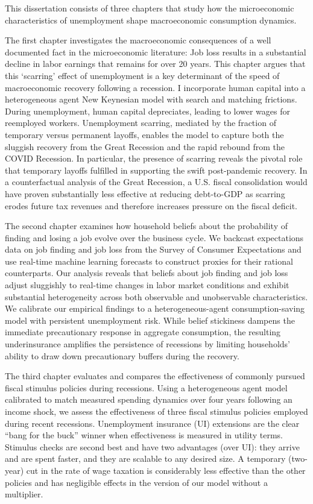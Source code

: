 %

This dissertation consists of three chapters that study how the microeconomic characteristics of unemployment shape macroeconomic consumption dynamics.

The first chapter investigates the macroeconomic consequences of a well documented fact in the microeconomic literature: Job loss results in a substantial decline in labor earnings that remains for over 20 years. This chapter argues that this `scarring' effect of unemployment is a key determinant of the speed of macroeconomic recovery following a recession. I incorporate human capital into a heterogeneous agent New Keynesian model with search and matching frictions. During unemployment, human capital depreciates, leading to lower wages for reemployed workers. Unemployment scarring, mediated by the fraction of temporary versus permanent layoffs, enables the model to capture both the sluggish recovery from the Great Recession and the rapid rebound from the COVID Recession. In particular, the presence of scarring reveals the pivotal role that temporary layoffs fulfilled in supporting the swift post-pandemic recovery. In a counterfactual analysis of the Great Recession, a U.S. fiscal consolidation would have proven substantially less effective at reducing debt-to-GDP as scarring erodes future tax revenues and therefore increases pressure on the fiscal deficit.

The second chapter examines how household beliefs about the probability of finding and losing a job evolve over the business cycle. We backcast expectations data on job finding and job loss from the Survey of Consumer Expectations and use real-time machine learning forecasts to construct proxies for their rational counterparts. Our analysis reveals that beliefs about job finding and job loss adjust sluggishly to real-time changes in labor market conditions and exhibit substantial heterogeneity across both observable and unobservable characteristics. We calibrate our empirical findings to a heterogeneous-agent consumption-saving model with persistent unemployment risk. While belief stickiness dampens the immediate precautionary response in aggregate consumption, the resulting underinsurance amplifies the persistence of recessions by limiting households’ ability to draw down precautionary buffers during the recovery.

The third chapter evaluates and compares the effectiveness of commonly pursued fiscal stimulus policies during recessions. Using a heterogeneous agent model calibrated to match measured spending dynamics over four years following an income shock, we assess the effectiveness of three fiscal stimulus policies employed during recent recessions. Unemployment insurance (UI) extensions are the clear “bang for the buck” winner when effectiveness is measured in utility terms. Stimulus checks are second best and have two advantages (over UI): they arrive and are spent faster, and they are scalable to any desired size. A temporary (two-year) cut in the rate of wage taxation is considerably less effective than the other policies and has negligible effects in the version of our model without a multiplier.



